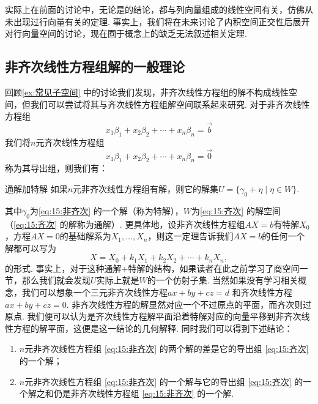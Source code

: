 实际上在前面的讨论中，无论是的结论，都与列向量组成的线性空间有关，仿佛从未出现过行向量有关的定理. 事实上，我们将在未来讨论了内积空间正交性后展开对行向量空间的讨论，现在囿于概念上的缺乏无法叙述相关定理.

\subsection{非齐次线性方程组解的一般理论}

回顾\autoref{ex:常见子空间} 中的讨论我们发现，非齐次线性方程组的解不构成线性空间，但我们可以尝试将其与齐次线性方程组解空间联系起来研究. 对于非齐次线性方程组
\begin{equation} \label{eq:15:非齐次}
    x_1\beta_1+x_2\beta_2+\cdots+x_n\beta_n=\vec{b}
\end{equation}
我们将$n$元齐次线性方程组
\begin{equation} \label{eq:15:齐次}
    x_1\beta_1+x_2\beta_2+\cdots+x_n\beta_n=\vec{0}
\end{equation}
称为其导出组，则我们有：
\begin{theorem}{}{通解加特解}
    如果$n$元非齐次线性方程组有解，则它的解集$U=\{\gamma_0+\eta \mid \eta \in W\}$.
\end{theorem}
其中$\gamma_0$为\autoref{eq:15:非齐次} 的一个解（称为特解），$W$为\autoref{eq:15:齐次} 的解空间（\autoref*{eq:15:齐次} 的解称为通解）. 更具体地，设非齐次线性方程组$AX=b$有特解$X_0$，方程$AX=0$的基础解系为$X_1,\ldots,X_n$，则这一定理告诉我们$AX=b$的任何一个解都可以写为
\[X=X_0+k_1X_1+k_2X_2+\cdots+k_nX_n,\]
的形式. 事实上，对于这种通解+特解的结构，如果读者在此之前学习了商空间一节，那么我们就会发现$U$实际上就是$W$的一个仿射子集. 当然如果没有学习相关概念，我们可以想象一个三元非齐次线性方程$ax + by + cz = d$ 和齐次线性方程$ax + by + cz = 0$. 非齐次线性方程的解显然对应一个不过原点的平面，而齐次则过原点. 我们便可以认为是齐次线性方程解平面沿着特解对应的向量平移到非齐次线性方程的解平面，这便是这一结论的几何解释. 同时我们可以得到下述结论：
\begin{enumerate}
    \item $n$元非齐次线性方程组 \ref*{eq:15:非齐次} 的两个解的差是它的导出组 \ref*{eq:15:齐次} 的一个解；

    \item $n$元非齐次线性方程组 \ref*{eq:15:非齐次} 的一个解与它的导出组 \ref*{eq:15:齐次} 的一个解之和仍是非齐次线性方程组 \ref*{eq:15:非齐次} 的一个解.
\end{enumerate}

